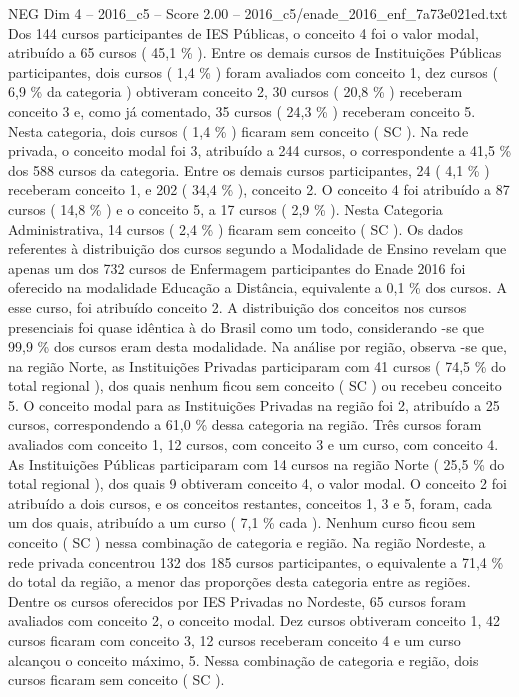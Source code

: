 \begin{textsample}{NEG Dim 4 – 2016\_c5 – Score 2.00 – 2016\_c5/enade\_2016\_enf\_7a73e021ed.txt}
Dos 144 cursos participantes de IES Públicas, o conceito 4 foi o valor modal, atribuído a 65 cursos ( 45,1 \% ).
Entre os demais cursos de Instituições Públicas participantes, dois cursos ( 1,4 \% ) foram avaliados com conceito 1, dez cursos ( 6,9 \% da categoria ) obtiveram conceito 2, 30 cursos ( 20,8 \% ) receberam conceito 3 e, como já comentado, 35 cursos ( 24,3 \% ) receberam conceito 5.
Nesta categoria, dois cursos ( 1,4 \% ) ficaram sem conceito ( SC ).
Na rede privada, o conceito modal foi 3, atribuído a 244 cursos, o correspondente a 41,5 \% dos 588 cursos da categoria.
Entre os demais cursos participantes, 24 ( 4,1 \% ) receberam conceito 1, e 202 ( 34,4 \% ), conceito 2.
O conceito 4 foi atribuído a 87 cursos ( 14,8 \% ) e o conceito 5, a 17 cursos ( 2,9 \% ).
Nesta Categoria Administrativa, 14 cursos ( 2,4 \% ) ficaram sem conceito ( SC ).
Os dados referentes à distribuição dos cursos segundo a Modalidade de Ensino revelam que apenas um dos 732 cursos de Enfermagem participantes do Enade 2016 foi oferecido na modalidade Educação a Distância, equivalente a 0,1 \% dos cursos.
A esse curso, foi atribuído conceito 2.
A distribuição dos conceitos nos cursos presenciais foi quase idêntica à do Brasil como um todo, considerando -se que 99,9 \% dos cursos eram desta modalidade.
Na análise por região, observa -se que, na região Norte, as Instituições Privadas participaram com 41 cursos ( 74,5 \% do total regional ), dos quais nenhum ficou sem conceito ( SC ) ou recebeu conceito 5.
O conceito modal para as Instituições Privadas na região foi 2, atribuído a 25 cursos, correspondendo a 61,0 \% dessa categoria na região.
Três cursos foram avaliados com conceito 1, 12 cursos, com conceito 3 e um curso, com conceito 4.
As Instituições Públicas participaram com 14 cursos na região Norte ( 25,5 \% do total regional ), dos quais 9 obtiveram conceito 4, o valor modal.
O conceito 2 foi atribuído a dois cursos, e os conceitos restantes, conceitos 1, 3 e 5, foram, cada um dos quais, atribuído a um curso ( 7,1 \% cada ).
Nenhum curso ficou sem conceito ( SC ) nessa combinação de categoria e região.
Na região Nordeste, a rede privada concentrou 132 dos 185 cursos participantes, o equivalente a 71,4 \% do total da região, a menor das proporções desta categoria entre as regiões.
Dentre os cursos oferecidos por IES Privadas no Nordeste, 65 cursos foram avaliados com conceito 2, o conceito modal.
Dez cursos obtiveram conceito 1, 42 cursos ficaram com conceito 3, 12 cursos receberam conceito 4 e um curso alcançou o conceito máximo, 5.
Nessa combinação de categoria e região, dois cursos ficaram sem conceito ( SC ).

\end{textsample}
